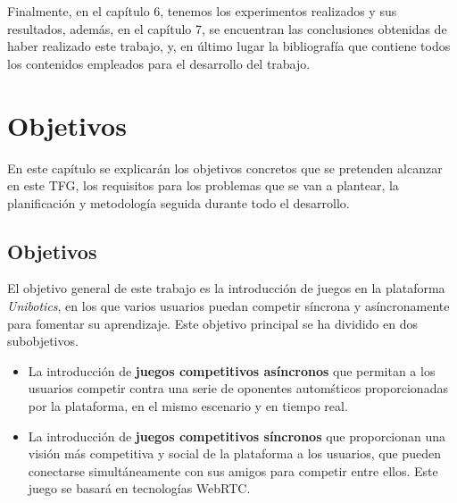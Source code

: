 \documentclass[a4paper, 12pt]{book}
\begin{document}
Finalmente, en el capítulo 6, tenemos los experimentos realizados y sus resultados, además, en el capítulo 7, se encuentran las conclusiones obtenidas de haber realizado este trabajo, y, en último lugar la bibliografía que contiene todos los contenidos empleados para el desarrollo del trabajo.


\cleardoublepage %
\chapter{Objetivos} %
\label{chap:objetivos} %

En este capítulo se explicarán los objetivos concretos que se pretenden alcanzar en este TFG, los requisitos para los problemas que se van a plantear, la planificación y metodología seguida durante todo el desarrollo.

\section{Objetivos} %
\label{sec:objetivo-general} %

El objetivo general de este trabajo es la introducción de juegos en la plataforma \emph{Unibotics}, en los que varios usuarios puedan competir síncrona y asíncronamente para fomentar su aprendizaje. Este objetivo principal se ha dividido en dos subobjetivos.

\begin{itemize}
\item La introducción de \textbf{juegos competitivos asíncronos} que permitan a los usuarios competir contra una serie de oponentes automśticos proporcionadas por la plataforma, en el mismo escenario y en tiempo real.
\item La introducción de \textbf{juegos competitivos síncronos} que proporcionan una visión más competitiva y social de la plataforma a los usuarios, que pueden conectarse simultáneamente con sus amigos para competir entre ellos. Este juego se basará en tecnologías WebRTC.
\end{itemize}
\end{document}
